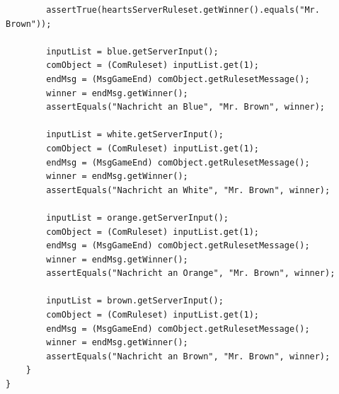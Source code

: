 \documentclass[twoside]{article}
\begin{document}
\begin{lstlisting}
		assertTrue(heartsServerRuleset.getWinner().equals("Mr. Brown"));
		
		inputList = blue.getServerInput();
		comObject = (ComRuleset) inputList.get(1);
		endMsg = (MsgGameEnd) comObject.getRulesetMessage();
		winner = endMsg.getWinner();
		assertEquals("Nachricht an Blue", "Mr. Brown", winner);

		inputList = white.getServerInput();
		comObject = (ComRuleset) inputList.get(1);
		endMsg = (MsgGameEnd) comObject.getRulesetMessage();
		winner = endMsg.getWinner();
		assertEquals("Nachricht an White", "Mr. Brown", winner);

		inputList = orange.getServerInput();
		comObject = (ComRuleset) inputList.get(1);
		endMsg = (MsgGameEnd) comObject.getRulesetMessage();
		winner = endMsg.getWinner();
		assertEquals("Nachricht an Orange", "Mr. Brown", winner);
	
		inputList = brown.getServerInput();
		comObject = (ComRuleset) inputList.get(1);
		endMsg = (MsgGameEnd) comObject.getRulesetMessage();
		winner = endMsg.getWinner();
		assertEquals("Nachricht an Brown", "Mr. Brown", winner);
	}
}
\end{lstlisting}
\end{document}

